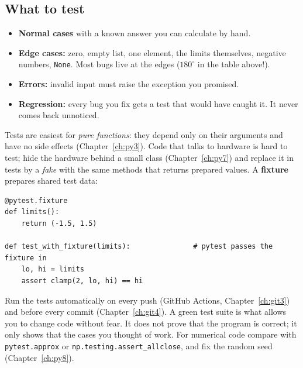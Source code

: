 \subsection*{What to test}
\begin{itemize}[nosep]
  \item \textbf{Normal cases} with a known answer you can calculate by hand.
  \item \textbf{Edge cases:} zero, empty list, one element, the limits themselves, negative numbers, \texttt{None}. Most bugs live at the edges ($180^\circ$ in the table above!).
  \item \textbf{Errors:} invalid input must raise the exception you promised.
  \item \textbf{Regression:} every bug you fix gets a test that would have caught it. It never comes back unnoticed.
\end{itemize}
Tests are easiest for \emph{pure functions}: they depend only on their arguments and have no side effects (Chapter~\ref{ch:py3}). Code that talks to hardware is hard to test; hide the hardware behind a small class (Chapter~\ref{ch:py7}) and replace it in tests by a \emph{fake} with the same methods that returns prepared values. A \textbf{fixture} prepares shared test data:
\begin{verbatim}
@pytest.fixture
def limits():
    return (-1.5, 1.5)

def test_with_fixture(limits):               # pytest passes the fixture in
    lo, hi = limits
    assert clamp(2, lo, hi) == hi
\end{verbatim}
Run the tests automatically on every push (GitHub Actions, Chapter~\ref{ch:git3}) and before every commit (Chapter~\ref{ch:git4}). A green test suite is what allows you to change code without fear. It does not prove that the program is correct; it only shows that the cases you thought of work. For numerical code compare with \texttt{pytest.approx} or \texttt{np.testing.assert\_allclose}, and fix the random seed (Chapter~\ref{ch:py8}).

